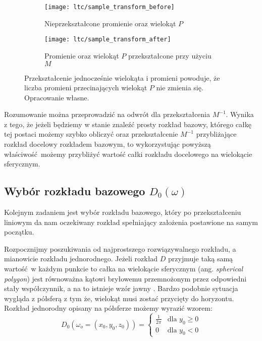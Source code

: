 \documentclass[../main.tex]{subfiles}
\begin{document}
\begin{figure}
    \centering
    \begin{subfigure}[t]{0.45\textwidth}
        \texttt{[image: ltc/sample\_transform\_before]}
        \label{fig:LTCTransformBefore}
        \caption{Nieprzekształcone promienie oraz wielokąt $P$}
    \end{subfigure}
    \hspace{0.05\textwidth}
    \begin{subfigure}[t]{0.45\textwidth}
        \centering
        \texttt{[image: ltc/sample\_transform\_after]}
        \label{fig:LTCTransformAfter}
        \caption{Promienie oraz wielokąt $P$ przekształcone przy użyciu $M$}
    \end{subfigure}
    
    \caption{Przekształcenie jednocześnie wielokąta i promieni powoduje, że liczba promieni przecinających wielokąt $P$ nie zmienia się. Opracowanie własne.}
    \label{fig:LTCTransformBeforeAfter}
\end{figure}

Rozumowanie można przeprowadzić na odwrót dla przekształcenia $M^{-1}$. Wynika z tego, że jeżeli będziemy w stanie znaleźć prosty rozkład bazowy, którego całkę tej postaci możemy szybko obliczyć oraz przekształcenie $M^{-1}$ przybliżające rozkład docelowy rozkładem bazowym, to wykorzystując powyższą właściwość możemy przybliżyć wartość całki rozkładu docelowego na wielokącie sferycznym.


\subsection{Wybór rozkładu bazowego $D_0(\omega)$}

Kolejnym zadaniem jest wybór rozkładu bazowego, który po przekształceniu liniowym da nam oczekiwany rozkład spełniający założenia postawione na samym początku.

Rozpocznijmy poszukiwania od najprostszego rozwiązywalnego rozkładu, a mianowicie rozkładu jednorodnego. Jeżeli rozkład $D$ przyjmuje taką samą wartość w każdym punkcie to całka na wielokącie sferycznym (ang. \textit{spherical polygon}) jest równoważna kątowi bryłowemu przemnożonym przez odpowiedni stały współczynnik, a na to istnieje wzór jawny \cite{Arvo,Snyder}. Bardzo podobnie sytuacja wygląda z półsferą z tym że, wielokąt musi zostać przycięty do horyzontu. Rozkład jednorodny opisany na półsferze możemy wyrazić wzorem:
\[
D_0(\omega_o=(x_0, y_0, z_0)) = \begin{cases}
  \frac{1}{2\pi} & \text{dla } y_0 \geq 0 \\
  0 & \text{dla } y_0 < 0
\end{cases}
\]
\end{document}
